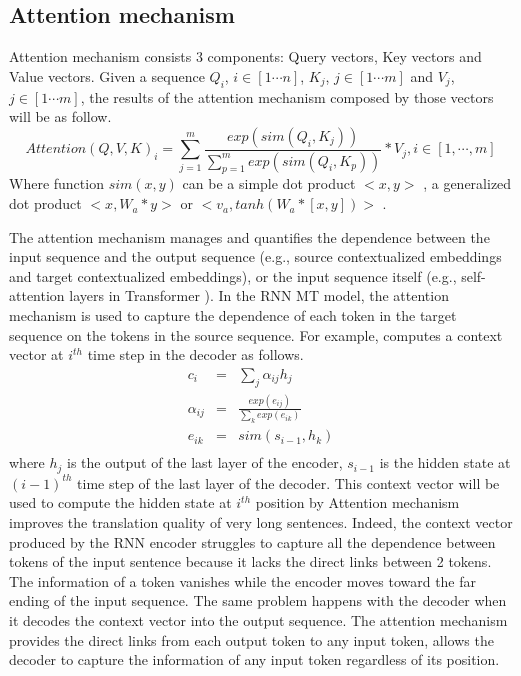 \subsection{Attention mechanism \label{ssec:attention}}
Attention mechanism consists 3 components: Query vectors, Key vectors and Value vectors. Given a sequence $Q_i$, $i \in [1 \cdots n]$, $K_j$, $j \in [1 \cdots m]$ and $V_j$, $j \in [1 \cdots m]$, the results
of the attention mechanism composed by those vectors will be as follow.
\begin{equation}
Attention(Q,V,K)_i = \displaystyle{\mathop{\sum}_{j=1}^{m}} \frac{exp(sim(Q_i,K_j))}{\displaystyle{\mathop{\sum}_{p=1}^{m}}exp(sim(Q_i,K_p))}*V_j, i \in [1, \cdots, m]
\end{equation}
Where function $sim(x,y)$ can be a simple dot product $<x,y>$ \citep{Vaswani17attention}, a generalized dot product $<x,W_a*y>$ or $<v_a,tanh(W_a*[x,y])>$ \citep{Luong15stanford, Bahdanau15learning}.

The attention mechanism manages and quantifies the dependence between the input sequence and the output sequence (e.g., source contextualized embeddings and target contextualized embeddings), or the input sequence itself (e.g., self-attention layers in Transformer \citep{Vaswani17attention}). In the RNN MT model, the attention mechanism is used to capture the dependence of each token in the target sequence on the tokens in the source sequence. For example, \cite{Bahdanau15learning} computes a context vector at $i^{th}$ time step in the decoder as follows.
\begin{equation}
\begin{array}{rcl}
c_i &=& \sum_{j} \alpha_{ij} h_j \\
\alpha_{ij} &=& \frac{exp(e_{ij})}{\sum_{k}exp(e_{ik})} \\
e_{ik} &=& sim(s_{i-1},h_k)\\
\end{array}
\end{equation}
where $h_j$ is the output of the last layer of the encoder, $s_{i-1}$ is the hidden state at $(i-1)^{th}$ time step of the last layer of the  decoder. This context vector will be used to compute the hidden state at $i^{th}$ position by Attention mechanism improves the translation quality of very long sentences. Indeed, the context vector produced by the RNN encoder struggles to capture all the dependence between tokens  of the input sentence because it lacks the direct links between 2 tokens. The information of a token vanishes while the encoder moves toward the far ending of the input sequence. The same problem happens with the decoder when it decodes the context vector into the output sequence. The attention mechanism provides the direct links from each output token to any input token, allows the decoder to capture the information of any input token regardless of its position.

